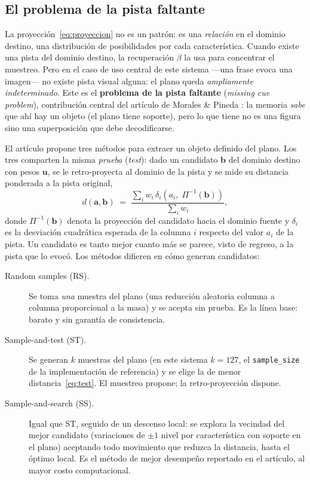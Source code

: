 \subsection{El problema de la pista faltante}
\label{sec:pista_faltante}

La proyección~\eqref{eq:proyeccion} no es un patrón: es una \emph{relación} en el
dominio destino, una distribución de posibilidades por cada característica.
Cuando existe una pista del dominio destino, la recuperación $\beta$ la usa para
concentrar el muestreo.
Pero en el caso de uso central de este sistema ---una frase evoca una imagen--- no
existe pista visual alguna: el plano queda \emph{ampliamente indeterminado}.
Este es el \textbf{problema de la pista faltante} (\emph{missing cue problem}),
contribución central del artículo de Morales \& Pineda \cite{morales2025missing}:
la memoria \emph{sabe} que ahí hay un objeto (el plano tiene soporte), pero lo que
tiene no es una figura sino una superposición que debe decodificarse.

El artículo propone tres métodos para extraer un objeto definido del plano.
Los tres comparten la misma \emph{prueba} (\emph{test}): dado un candidato
$\mathbf{b}$ del dominio destino con pesos $\mathbf{u}$, se le retro-proyecta al
dominio de la pista y se mide su distancia ponderada a la pista original,
\begin{equation}
    d(\mathbf{a}, \mathbf{b}) \;=\;
    \frac{\sum_{i} w_i \, \delta_i\!\left(a_i,\; \Pi^{-1}(\mathbf{b})\right)}
         {\sum_{i} w_i},
    \label{eq:test}
\end{equation}
donde $\Pi^{-1}(\mathbf{b})$ denota la proyección del candidato hacia el dominio
fuente y $\delta_i$ es la desviación cuadrática esperada de la columna $i$ respecto
del valor $a_i$ de la pista.
Un candidato es tanto mejor cuanto más se parece, visto de regreso, a la pista que lo
evocó.
Los métodos difieren en cómo generan candidatos:

\begin{description}
    \item[Random samples (RS).] Se toma \emph{una} muestra del plano (una reducción
    aleatoria columna a columna proporcional a la masa) y se acepta sin prueba.
    Es la línea base: barato y sin garantía de consistencia.

    \item[Sample-and-test (ST).] Se generan $k$ muestras del plano (en este sistema
    $k = 127$, el \texttt{sample\_size} de la implementación de referencia) y se
    elige la de menor distancia~\eqref{eq:test}.
    El muestreo propone; la retro-proyección dispone.

    \item[Sample-and-search (SS).] Igual que ST, seguido de un descenso local: se
    explora la vecindad del mejor candidato (variaciones de $\pm 1$ nivel por
    característica con soporte en el plano) aceptando todo movimiento que reduzca la
    distancia, hasta el óptimo local.
    Es el método de mejor desempeño reportado en el artículo, al mayor costo
    computacional.
\end{description}

